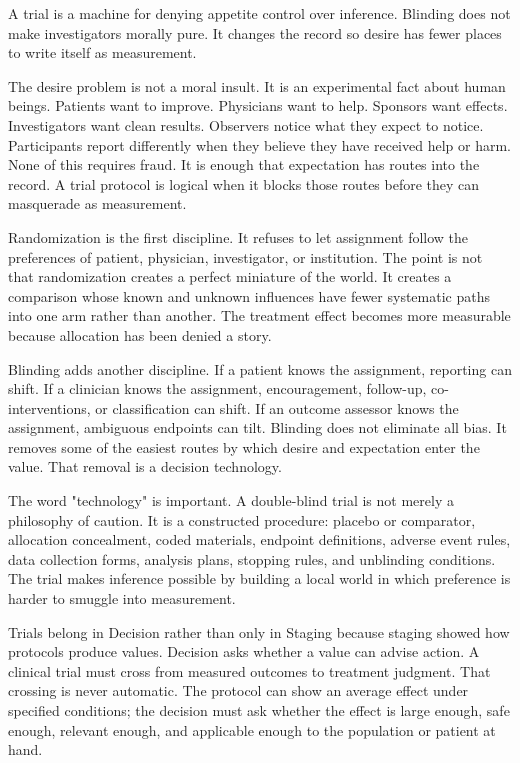 A trial is a machine for denying appetite control over inference. Blinding does
not make investigators morally pure. It changes the record so desire has fewer
places to write itself as measurement.

The desire problem is not a moral insult. It is an experimental fact about
human beings. Patients want to improve. Physicians want to help. Sponsors want
effects. Investigators want clean results. Observers notice what they expect
to notice. Participants report differently when they believe they have
received help or harm. None of this requires fraud. It is enough that
expectation has routes into the record. A trial protocol is logical when it
blocks those routes before they can masquerade as measurement.

Randomization is the first discipline. It refuses to let assignment follow
the preferences of patient, physician, investigator, or institution. The
point is not that randomization creates a perfect miniature of the world. It
creates a comparison whose known and unknown influences have fewer systematic
paths into one arm rather than another. The treatment effect becomes more
measurable because allocation has been denied a story.

Blinding adds another discipline. If a patient knows the assignment, reporting
can shift. If a clinician knows the assignment, encouragement, follow-up,
co-interventions, or classification can shift. If an outcome assessor knows
the assignment, ambiguous endpoints can tilt. Blinding does not eliminate all
bias. It removes some of the easiest routes by which desire and expectation
enter the value. That removal is a decision technology.

The word "technology" is important. A double-blind trial is not merely a
philosophy of caution. It is a constructed procedure: placebo or comparator,
allocation concealment, coded materials, endpoint definitions, adverse event
rules, data collection forms, analysis plans, stopping rules, and unblinding
conditions. The trial makes inference possible by building a local world in
which preference is harder to smuggle into measurement.

Trials belong in Decision rather than only in Staging because staging showed
how protocols produce values. Decision asks whether a value can advise
action. A clinical trial must cross from measured outcomes to treatment
judgment. That crossing is never automatic. The protocol can show an average
effect under specified conditions; the decision must ask whether the effect
is large enough, safe enough, relevant enough, and applicable enough to the
population or patient at hand.

